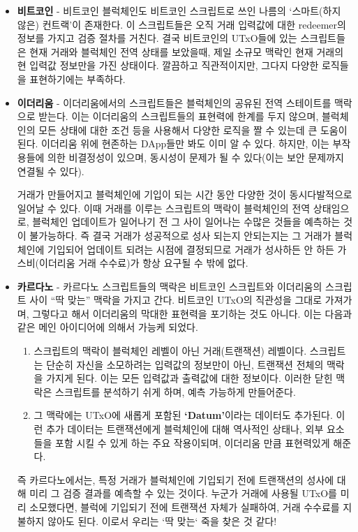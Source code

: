\documentclass[a4paper, 11pt]{article}
\begin{document}
    \begin{itemize}
        \item \textbf{비트코인} - 비트코인 블럭체인도 비트코인 스크립트로 쓰인 나름의 `스마트(하지 않은) 컨트랙'이 존재한다. 이 스크립트들은 오직 거래 입력값에 대한 redeemer의 정보를 가지고 검증 절차를 거친다. 결국 비트코인의 UTxO들에 있는 스크립트들은 현재 거래와 블럭체인 전역 상태를 보았을때, 제일 소규모 맥락인 현재 거래의 현 입력값 정보만을 가진 상태이다. 깔끔하고 직관적이지만, 그다지 다양한 로직들을 표현하기에는 부족하다.
        
        \item \textbf{이더리움} - 이더리움에서의 스크립트들은 블럭체인의 공유된 전역 스테이트를 맥락으로 받는다. 이는 이더리움의 스크립트들의 표현력에 한계를 두지 않으며, 블럭체인의 모든 상태에 대한 조건 등을 사용해서 다양한 로직을 짤 수 있는데 큰 도움이 된다. 이더리움 위에 현존하는 DApp들만 봐도 이미 알 수 있다. 하지만, 이는 부작용들에 의한 비결정성이 있으며, 동시성이 문제가 될 수 있다(이는 보안 문제까지 연결될 수 있다).
        
        거래가 만들어지고 블럭체인에 기입이 되는 시간 동안 다양한 것이 동시다발적으로 일어날 수 있다. 이때 거래를 이루는 스크립트의 맥락이 블럭체인의 전역 상태임으로, 블럭체인 업데이트가 일어나기 전 그 사이 일어나는 수많은 것들을 예측하는 것이 불가능하다. 즉 결국 거래가 성공적으로 성사 되는지 안되는지는 그 거래가 블럭체인에 기입되어 업데이트 되려는 시점에 결정되므로 거래가 성사하든 안 하든 가스비(이더리움 거래 수수료)가 항상 요구될 수 밖에 없다.

        \item \textbf{카르다노} - 카르다노 스크립트들의 맥락은 비트코인 스크립트와 이더리움의 스크립트 사이 ``딱 맞는'' 맥락을 가지고 간다. 비트코인 UTxO의 직관성을 그대로 가져가며, 그렇다고 해서 이더리움의 막대한 표현력을 포기하는 것도 아니다. 이는 다음과 같은 메인 아이디어에 의해서 가능케 되었다.
        
        \begin{enumerate}
            \item 스크립트의 맥락이 블럭체인 레벨이 아닌 거래(트랜잭션) 레벨이다. 스크립트는 단순히 자신을 소모하려는 입력값의 정보만이 아닌, 트랜잭션 전체의 맥락을 가지게 된다. 이는 모든 입력값과 출력값에 대한 정보이다. 이러한 닫힌 맥락은 스크립트를 분석하기 쉬게 하며, 예측 가능하게 만들어준다.
            \item 그 맥락에는 UTxO에 새롭게 포함된 \textbf{`Datum'}이라는 데이터도 추가된다. 이런 추가 데이터는 트랜잭션에게 블럭체인에 대해 역사적인 상태나, 외부 요소들을 포함 시킬 수 있게 하는 주요 작용이되며, 이더리움 만큼 표현력있게 해준다.
        \end{enumerate}

        즉 카르다노에서는, 특정 거래가 블럭체인에 기입되기 전에 트랜잭션의 성사에 대해 미리 그 검증 결과를 예측할 수 있는 것이다. 누군가 거래에 사용될 UTxO를 미리 소모했다면, 블럭에 기입되기 전에 트랜잭션 자체가 실패하여, 거래 수수료를 지불하지 않아도 된다. 이로서 우리는 `딱 맞는` 죽을 찾은 것 같다! 
    \end{itemize}
\end{document}
